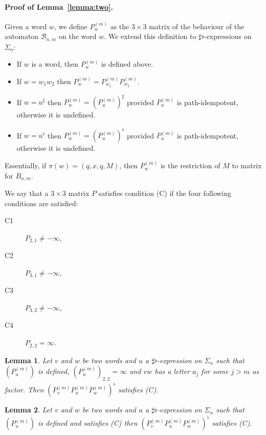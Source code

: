 \documentclass[10pt,a4paper]{amsart}
\newtheorem{lem}[lem]{Lemma}
\theoremstyle{definition}
\numberwithin{equation}{section}
\theoremstyle{remark}
\theoremstyle{remark}
\begin{document}
\paragraph{Proof of Lemma~\ref{lemma:two}.}
Given a word $w$, we define $P^{(m)}_w$ as the $3\times 3$ matrix of the behaviour of the automaton $\mathcal{B}_{n,m}$ on the word $w$. We extend this definition to $\sharp \flat$-expressions on $\Sigma_n$:
\begin{itemize}
\item If $w$ is a word, then $P^{(m)}_w$ is defined above.
\item If $w = w_1w_2$ then $P^{(m)}_w = P^{(m)}_{w_1}P^{(m)}_{w_2}$.
\item If $w = u^\sharp$ then $P^{(m)}_w = (P^{(m)}_{u})^\sharp$ provided $P^{(m)}_{u}$ is path-idempotent, otherwise it is undefined.
\item If $w = u^\flat$ then $P^{(m)}_w = (P^{(m)}_{u})^\flat$ provided $P^{(m)}_{u}$ is path-idempotent, otherwise it is undefined.
\end{itemize}
Essentially, if $\pi(w) = (q,x,q, M)$, then $P_w^{(m)}$ is the restriction of $M$ to matrix for $B_{n,m}$.


We say that a $3\times 3$ matrix $P$ satisfies condition (C) if the four following conditions are satisfied: 
\begin{description}
    
\item[C1] $P_{2,1} \neq -\infty$, 
\item[C2] $P_{3,1} \neq -\infty$,
\item[C3] $P_{3,2} \neq -\infty$,
\item[C4] $P_{2,2} = \infty$.
\end{description}

\begin{lem}
\label{lemma:twoA}
Let $v$ and $w$ be two words and $u$ a $\sharp \flat$-expression on $\Sigma_n$ such that $(P^{(m)}_u)$ is defined, $(P^{(m)}_u)_{2,2} = \infty$ and $vw$ has a letter $a_j$ for some $j>m$ as factor. 
Then $(P^{(m)}_v P^{(m)}_u P^{(m)}_w)^\flat$ satisfies (C).
\end{lem}

\begin{lem}
\label{lemma:twoB}
Let $v$ and $w$ be two words and $u$ a $\sharp \flat$-expression on $\Sigma_n$ such that $(P^{(m)}_u)$ is defined and satisfies (C) then $(P^{(m)}_v P^{(m)}_u P^{(m)}_w)^\flat$ satisfies (C).
\end{lem}
\end{document}
